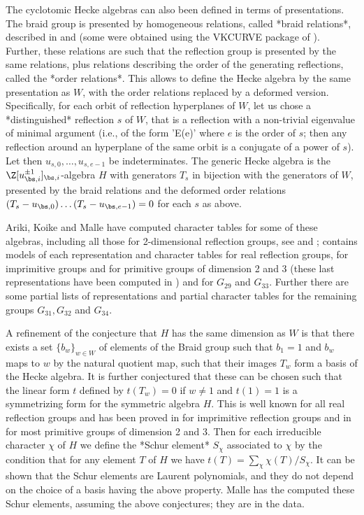 The   cyclotomic  Hecke  algebras  can  also   been  defined  in  terms  of
presentations.  The  braid  group  is  presented  by homogeneous relations,
called  *braid relations*, described in  \cite{BMR98} and \cite{BM03} (some
were  obtained  using  the  VKCURVE  package  of  {\GAP}).  Further,  these
relations  are  such  that  the  reflection  group is presented by the same
relations,   plus  relations   describing  the   order  of  the  generating
reflections,  called the *order relations*. This allows to define the Hecke
algebra  by the same presentation as $W$, with the order relations replaced
by   a  deformed  version.  Specifically,  for  each  orbit  of  reflection
hyperplanes  of $W$, let us chose  a *distinguished* reflection $s$ of $W$,
that  is a  reflection with  a non-trivial  eigenvalue of  minimal argument
(i.e.,  of  the  form  'E(e)'  where  $e$  is  the  order  of $s$; then any
reflection around an hyperplane of the same orbit is a conjugate of a power
of $s$). Let then $u_{s,0},\ldots,u_{s,e-1}$ be indeterminates. The generic
Hecke  algebra  is  the  $\Z[u_{\bs,i}^{\pm  1}]_{\bs,i}$-algebra  $H$ with
generators  $T_s$ in bijection with the generators of $W$, presented by the
braid relations and the deformed order relations
$(T_s-u_{\bs,0})\ldots(T_s-u_{\bs,e-1})=0$ for each $s$ as above.

Ariki,  Koike and  Malle have  computed character  tables for some of these
algebras,  including  all  those  for  2-dimensional reflection groups, see
\cite{BM93}   and   \cite{Mal96};   {\CHEVIE}   contains   models  of  each
representation  and  character  tables  for  real  reflection  groups,  for
imprimitive  groups and  for primitive  groups of  dimension 2 and 3 (these
last  representations have been  computed in \cite{MM10})  and for $G_{29}$
and  $G_{33}$. Further there are some  partial lists of representations and
partial  character  tables  for  the  remaining  groups $G_{31},G_{32}$ and
$G_{34}$.

A  refinement of the conjecture  that $H$ has the  same dimension as $W$ is
that  there exists a set $\{b_w\}_{w\in W}$  of elements of the Braid group
such  that $b_1=1$ and $b_w$ maps to  $w$ by the natural quotient map, such
that  their images $T_w$ form  a basis of the  Hecke algebra. It is further
conjectured  that these can be chosen such that the linear form $t$ defined
by  $t(T_w)=0$ if  $w\ne 1$  and $t(1)=1$  is a  symmetrizing form  for the
symmetric  algebra $H$. This  is well known  for all real reflection groups
and has been proved in \cite{MM98} for imprimitive reflection groups and in
\cite{MM10}  for most primitive groups of dimension  2 and 3. Then for each
irreducible  character $\chi$ of $H$ we define the *Schur element* $S_\chi$
associated  to $\chi$ by the  condition that for any  element $T$ of $H$ we
have  $t(T)=\sum_\chi  \chi(T)/S_\chi$.  It  can  be  shown  that the Schur
elements are Laurent polynomials, and they do not depend on the choice of a
basis  having  the  above  property.  Malle  has  the  computed these Schur
elements, assuming the above conjectures; they are in the {\CHEVIE} data.

